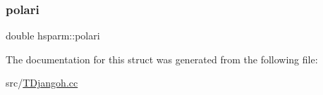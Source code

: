 \mbox{\label{structhsparm_ab9e3d5d5c31640579cad357b9437f321}} 
\subsubsection{\texorpdfstring{polari}{polari}}
{\footnotesize\ttfamily double hsparm\+::polari}



The documentation for this struct was generated from the following file\+:\begin{DoxyCompactItemize}
\item 
src/\hyperlink{_t_djangoh_8cc}{T\+Djangoh.\+cc}\end{DoxyCompactItemize}
